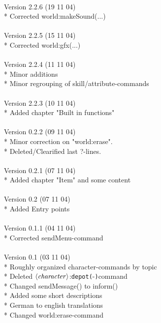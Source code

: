 \documentclass[a4paper,10pt,makeidx]{scrreprt}
\newcommand{\com}[2]{\index{#1}\texttt{#1(}#2\texttt{)}}
\newcommand{\var}[1]{$\left\langle \text{\emph{#1}} \right\rangle$}
\begin{document}
\\
Version 2.2.6 (19 11 04)\\
* Corrected world:makeSound(...)\\
\\
Version 2.2.5 (15 11 04)\\
* Corrected world:gfx(...)\\
\\
Version 2.2.4 (11 11 04)\\
* Minor additions\\
* Minor regrouping of skill/attribute-commands\\
\\
Version 2.2.3 (10 11 04)\\
* Added chapter "Built in functions"\\
\\
Version 0.2.2 (09 11 04)\\
* Minor correction on "world:erase".\\
* Deleted/Clearified last ?-lines.\\
\\
Version 0.2.1 (07 11 04)\\
* Added chapter "Item" and some content\\
\\
Version 0.2 (07 11 04)\\
* Added Entry points\\
\\
Version 0.1.1 (04 11 04)\\
* Corrected sendMenu-command\\
\\
Version 0.1 (03 11 04)\\
* Roughly organized character-commands by topic\\
* Deleted \var{character}:\com{depot}-command\\
* Changed sendMessage() to inform()\\
* Added some short descriptions\\
* German to english translations\\
* Changed world:erase-command

\printindex
\end{document}
